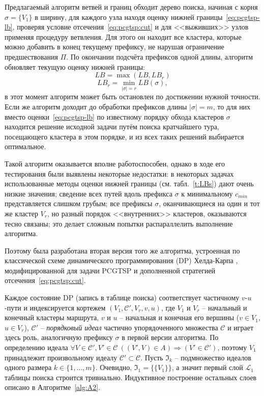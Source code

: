Предлагаемый алгоритм ветвей и границ обходит дерево поиска,
начиная с корня
$\sigma=\{V_1\}$
в ширину,
для каждого узла
находя оценку нижней границы~\eqref{eq:pcgtsp-lb},
проверяя условие отсечения~\eqref{eq:pcgtsp:cut}
и для <<выживших>> узлов применяя процедуру ветвления.
Для этого он находит все кластера,
которые можно добавить в конец текущему префиксу,
не нарушая ограничение предшествования $\Pi$.
По окончании подсчёта префиксов одной длины,
алгоритм обновляет текущую оценку нижней границы:
$$
LB = \max(LB, LB_r)
$$
$$
LB_r = \min_{|\sigma|=r} LB(\sigma),
$$
в этот момент алгоритм может быть остановлен
по достижении нужной точности.
Если же алгоритм доходит до обработки
префиксов длины
$|\sigma|=m$,
то для них вместо оценки~\eqref{eq:pcgtsp-lb}
по известному порядку обхода кластеров $\sigma$
находится решение исходной задачи путём поиска кратчайшего тура,
посещающего кластера в этом порядке,
и из всех таких решений выбирается оптимальное.

Такой алгоритм оказывается вполне работоспособен,
однако в ходе его тестирования были выявлены некоторые недостатки:
  в некоторых задачах использованные методы
  оценки нижней границы
  (см. табл.~\ref{t:LBs})
  дают очень низкие значения;
  сведение всех путей вдоль префикса $\sigma$
  к минимальному $c_{min}$
  представляется слишком грубым;
  все префиксы $\sigma$,
  оканчивающиеся на один и тот же
  кластер $V_r$,
  но разный порядок <<внутренних>> кластеров,
  оказываются тесно связаны;
  это делает сложным попытки распараллелить
  выполнение алгоритма.

Поэтому была разработана вторая версия того же алгоритма,
устроенная по классической схеме
динамического программирования (DP)
Хелда-Карпа
\autocite{HeldKarp1962},
модифицированной для задачи PCGTSP
и дополненной стратегией отсечения~\eqref{eq:pcgtsp:cut}.

Каждое состояние DP
(запись в таблице поиска)
соответствует частичному
$v$-$u$-пути
и индексируется кортежем
$(V_1, \mathcal C',V_r,v, u)$, где
$V_1$ и $V_r$ -- начальный и конечный кластеры маршрута,
$v$ и $u$ -- начальная и конечная его вершины ($v\in V_1$, $u\in V_r$),
$\mathcal C'$ -- {\it порядковый идеал} частично упорядоченного множества $\mathcal C$
и играет здесь роль, аналогичную префиксу $\sigma$
в первой версии алгоритма.
По определению идеала
\(
    \forall V\in\mathcal C', V'\in\mathcal C\
    \left((V',V)\in A\right)
    \Rightarrow (V'\in\mathcal C')
\),
поэтому $V_1$
принадлежит произвольному идеалу
$\mathcal C'\subset\mathcal C$.
Пусть $\mathfrak I_k$
-- подмножество идеалов одного размера
$k\in\{1,\ldots,m\}$.
Очевидно,
$\mathfrak I_1=\{\{V_1\}\}$,
а значит первый слой
$\mathcal L_1$
таблицы поиска строится тривиально.
Индуктивное построение остальных слоев
описано в Алгоритме~\ref{alg:A2}.

